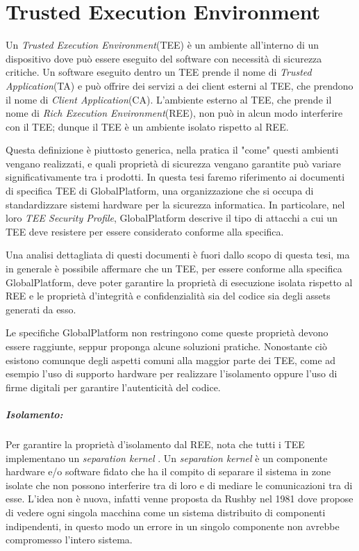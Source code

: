 \documentclass[12pt,italian]{report}
\begin{document}
\chapter{Trusted Execution Environment}
\label{sec:tee}
Un \textit{Trusted Execution Environment}(TEE) è un ambiente all'interno di
un dispositivo dove può essere eseguito del software con necessità di sicurezza
critiche.
Un software eseguito dentro un TEE prende il nome di
\textit{Trusted Application}(TA) e può offrire dei servizi a dei client
esterni al TEE, che prendono il nome di \textit{Client Application}(CA).
L'ambiente esterno al TEE, che prende il nome di
\textit{Rich Execution Environment}(REE), non può in alcun modo interferire
con il TEE; dunque il TEE è un ambiente isolato rispetto al REE.

Questa definizione è piuttosto generica, nella pratica il "come" questi
ambienti vengano realizzati, e quali proprietà di sicurezza vengano garantite
può variare significativamente tra i prodotti.
In questa tesi faremo riferimento ai documenti di specifica TEE di
GlobalPlatform, una organizzazione che si occupa di standardizzare sistemi
hardware per la sicurezza informatica.
In particolare, nel loro
\textit{TEE Security Profile}\cite{gp2020securityprofile}, GlobalPlatform
descrive il tipo di attacchi a cui un TEE deve resistere per essere
considerato conforme alla specifica.

Una analisi dettagliata di questi documenti è fuori dallo scopo di questa
tesi, ma in generale è possibile affermare che un TEE, per essere conforme
alla specifica GlobalPlatform, deve poter garantire la proprietà di esecuzione
isolata rispetto al REE e le proprietà d'integrità e confidenzialità sia del
codice sia degli assets generati da esso.

Le specifiche GlobalPlatform non restringono come queste proprietà devono
essere raggiunte, seppur proponga alcune soluzioni pratiche.
Nonostante ciò esistono comunque degli aspetti comuni alla maggior parte dei
TEE, come ad esempio l'uso di supporto hardware per realizzare l'isolamento
oppure l'uso di firme digitali per garantire l'autenticità del codice.

\paragraph{Isolamento:}
Per garantire la proprietà d'isolamento dal REE, \cite{sabt2015tee} nota
che tutti i TEE implementano un \textit{separation kernel}
\cite{rushby1981separationkernel}. 
Un \textit{separation kernel} è un componente hardware e/o software fidato che
ha il compito di separare il sistema in zone isolate che non possono
interferire tra di loro e di mediare le comunicazioni tra di esse.
L'idea non è nuova, infatti venne proposta da Rushby nel 1981 dove propose
di vedere ogni singola macchina come un sistema distribuito di componenti
indipendenti, in questo modo un errore in un singolo componente non avrebbe
compromesso l'intero sistema.
\end{document}

